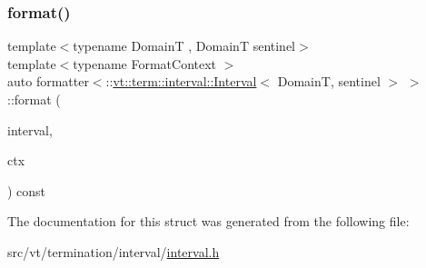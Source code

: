 \subsubsection{\texorpdfstring{format()}{format()}}
{\footnotesize\ttfamily template$<$typename DomainT , DomainT sentinel$>$ \\
template$<$typename Format\+Context $>$ \\
auto formatter$<$\+::\hyperlink{structvt_1_1term_1_1interval_1_1_interval}{vt\+::term\+::interval\+::\+Interval}$<$ DomainT, sentinel $>$ $>$\+::format (\begin{DoxyParamCaption}\item[{const \+::\hyperlink{structvt_1_1term_1_1interval_1_1_interval}{vt\+::term\+::interval\+::\+Interval}$<$ DomainT, sentinel $>$ \&}]{interval,  }\item[{Format\+Context \&}]{ctx }\end{DoxyParamCaption}) const\hspace{0.3cm}{\ttfamily [inline]}}



The documentation for this struct was generated from the following file\+:\begin{DoxyCompactItemize}
\item 
src/vt/termination/interval/\hyperlink{interval_8h}{interval.\+h}\end{DoxyCompactItemize}
